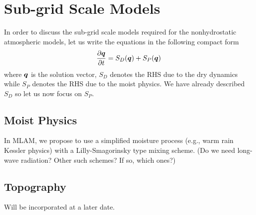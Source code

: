 
\section{Sub-grid Scale Models}
\label{sec:sgs_models}

In order to discuss the sub-grid scale models required for the nonhydrostatic atmospheric models, let us write the equations in the following compact form  
\[
\frac{\partial \mbox{\boldmath$q$\unboldmath}}{\partial t} = S_D(\mbox{\boldmath$q$\unboldmath}) + S_P(\mbox{\boldmath$q$\unboldmath})
\]
where $\mbox{\boldmath$q$\unboldmath}$ is the solution vector, $S_D$ denotes the RHS due to the dry dynamics while $S_P$ denotes the RHS due to the moist physics. We have already described $S_D$ so let us now focus on $S_P$.

\subsection{Moist Physics}
In MLAM, we propose to use a simplified moisture process (e.g., warm rain Kessler physics) with a Lilly-Smagorinsky type mixing scheme.    (Do we need long-wave radiation? Other such schemes?  If so, which ones?)

\subsection{Topography}
Will be incorporated at a later date.